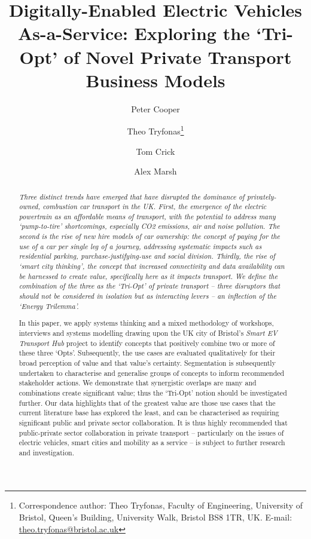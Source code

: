 \documentclass[b5paper,10pt]{article}
\title{Digitally-Enabled Electric Vehicles As-a-Service: Exploring the
  `Tri-Opt' of Novel Private Transport Business Models}
\author[1]{Peter Cooper}
\author[2]{Theo Tryfonas\thanks{Correspondence author: Theo Tryfonas,
    Faculty of Engineering, University of Bristol, Queen's Building,
    University Walk, Bristol BS8 1TR, UK. E-mail: \url{theo.tryfonas@bristol.ac.uk}}}
\author[3]{Tom Crick}
\author[4]{Alex Marsh}
\affil[1]{Faculty of Engineering, University of Bristol, UK}
\affil[2]{Faculty of Engineering, University of Bristol, UK}
\affil[3]{Department of Computing, Cardiff Metropolitan University, UK}
\affil[4]{School for Policy Studies, University of Bristol, UK}
\affil[1]{\protect\url{peter.cooper@bristol.ac.uk}}
\affil[2]{\protect\url{theo.tryfonas@bristol.ac.uk}}
\affil[3]{\protect\url{tcrick@cardiffmet.ac.uk}}
\affil[4]{\protect\url{alex.marsh@bristol.ac.uk}}
\date{ }
\begin{document}
\maketitle

\begin{abstract}
{\it Three distinct trends have emerged that have disrupted the dominance
of privately-owned, combustion car transport in the UK. First, the
emergence of the electric powertrain as an affordable means of
transport, with the potential to address many ‘pump-to-tire’
shortcomings, especially CO2 emissions, air and noise pollution. The
second is the rise of new hire models of car ownership: the concept of
paying for the use of a car per single leg of a journey, addressing
systematic impacts such as residential parking,
purchase-justifying-use and social division. Thirdly, the rise of
`smart city thinking', the concept that increased connectivity and
data availability can be harnessed to create value, specifically here
as it impacts transport. We define the combination of the three as the
`Tri-Opt' of private transport -- three disruptors that should not be
considered in isolation but as interacting levers -- an inflection of
the `Energy Trilemma'.

In this paper, we apply systems thinking and a mixed methodology of
workshops, interviews and systems modelling drawing upon the UK city
of Bristol's {\emph{Smart EV Transport Hub}} project to identify
concepts that positively combine two or more of these three
`Opts'. Subsequently, the use cases are evaluated qualitatively for
their broad perception of value and that value's
certainty. Segmentation is subsequently undertaken to characterise and
generalise groups of concepts to inform recommended stakeholder
actions. We demonstrate that synergistic overlaps are many and
combinations create significant value; thus the `Tri-Opt' notion
should be investigated further. Our data highlights that of the
greatest value are those use cases that the current literature base
has explored the least, and can be characterised as requiring
significant public and private sector collaboration. It is thus highly
recommended that public-private sector collaboration in private
transport -- particularly on the issues of electric vehicles, smart
cities and mobility as a service -- is subject to further research and
investigation.}
\end{abstract}

\end{document}
